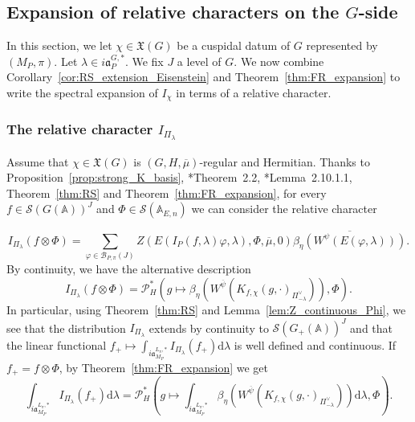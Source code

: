 \documentclass[letterpaper,11pt]{amsart}
\newcommand{\fa}{\mathfrak{a}}
\newcommand{\fX}{\mathfrak{X}}
\newcommand{\bA}{\mathbb{A}}
\newcommand{\cP}{\mathcal{P}}
\newcommand{\cS}{\mathcal{S}}
\newcommand{\rd}{\mathrm{d}}
\newcommand{\<}{\negthickspace}
\theoremstyle{definition}
\theoremstyle{plain}
\theoremstyle{remark}
\numberwithin{equation}{section}
\begin{document}
\subsection{Expansion of relative characters on the \texorpdfstring{$G$}{G}-side}
\label{sec:expansion_char_gln}

In this section, we let $\chi \in \fX(G)$ be a cuspidal datum of $G$ represented by $(M_P,\pi)$. Let $\lambda \in i
\mathfrak{a}_{P}^{G,*}$. We fix $J$ a level of $G$. We now combine Corollary~\ref{cor:RS_extension_Eisenstein} and Theorem~\ref{thm:FR_expansion} to write the spectral expansion of $I_{\chi}$ in terms of a relative character.

\subsubsection{The relative character \texorpdfstring{$I_{\Pi_\lambda}$}{}}
\label{subsec:I_PI_defi}
Assume that $\chi \in \mathfrak{X}(G)$ is $(G,H,\overline{\mu})$-regular and Hermitian. Thanks to Proposition~\ref{prop:strong_K_basis}, \cite{Lap}*{Theorem~2.2}, \cite{BPCZ}*{Lemma~2.10.1.1}, Theorem~\ref{thm:RS} and Theorem~\ref{thm:FR_expansion}, for every $f \in \cS(G(\bA))^J$ and $\Phi \in \cS(\bA_{E,n})$ we can consider the relative character 

\begin{equation}    \label{eq:IPi}
    I_{\Pi_\lambda}(f \otimes \Phi) =
    \sum_{\varphi \in \mathcal{B}_{P,\pi}(J)}
    Z(E(I_P(f,\lambda)\varphi,\lambda), \Phi, \overline{\mu}, 0)
    \overline{\beta_\eta(W^{\psi}(E(\varphi,\lambda)))}.
    \end{equation}
By continuity, we have the alternative description
\begin{equation}
    \label{eq:I_Pi_lambda_estimate}
        I_{\Pi_\lambda}(f \otimes \Phi)=\cP_{H}^*\left(g \mapsto
        \beta_{\eta}\left(
        W^{\overline{\psi}}\left(K_{f, \chi}(g, \cdot)_{\Pi^\vee_{-\lambda}} \right) \right), \Phi\right).
    \end{equation}
In particular, using Theorem~\ref{thm:RS} and Lemma~\ref{lem:Z_continuous_Phi}, we see that the distribution $I_{\Pi_\lambda}$ extends by continuity to $\cS(G_+(\bA))^J$ and that the linear functional $f_+ \mapsto \int_{i \fa_{M_P}^{L_\pi,*}} I_{\Pi_{\lambda}}(f_+) \rd \lambda$ is well defined and continuous. If $f_+=f \otimes \Phi$, by Theorem~\ref{thm:FR_expansion} we get
\begin{equation}
    \label{eq:integral_character}
    \int_{i \mathfrak{a}_{M_P}^{L_\pi, *}} I_{\Pi_\lambda}(f_+)
    \rd \lambda=\cP_{H}^*\left(g \mapsto \int_{i \mathfrak{a}_{M_P}^{L_\pi, *}}
    \beta_{\eta}\left(
        W^{\overline{\psi}}\left(K_{f, \chi}(g, \cdot)_{\Pi^\vee_{-\lambda}} \right) \right) \rd \lambda,\Phi\right).
\end{equation}
\end{document}
